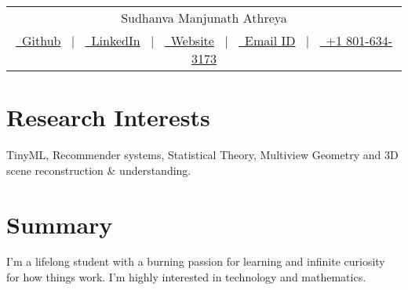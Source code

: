 \documentclass[a4paper, 11pt]{article}
\begin{document}
	
	\pagestyle{empty} 
	
	
	
	\begin{tabularx}{\linewidth}{@{} C @{}}
		\Huge{Sudhanva Manjunath Athreya} \\[7.5pt]
		\href{https://github.com/FoxHound0x00}{\raisebox{-0.05\height}\faGithub\ Github} \ $|$ \ 
		\href{https://www.linkedin.com/in/athreya32262/}{\raisebox{-0.05\height}\faLinkedin\ LinkedIn} \ $|$ \ 
		\href{https://foxhound0x00.github.io/}{\raisebox{-0.05\height}\faGlobe \ Website} \ $|$ \ 
		\href{mailto:u1529299@hotmail.com}{\raisebox{-0.05\height}\faEnvelope \ Email ID} \ $|$ \ 
		\href{tel:+91 910-817-1918}{\raisebox{-0.05\height}\faMobile \ +1 801-634-3173} \\
	\end{tabularx}
	
	
	\section{Research Interests}
	
	TinyML, Recommender systems, Statistical Theory, Multiview Geometry and 3D scene reconstruction \& understanding. 

	
	\section{Summary}
 
	I'm a lifelong student with a burning passion for learning and infinite curiosity for how things work. I'm highly interested in technology and mathematics.
	\\
\end{document}
